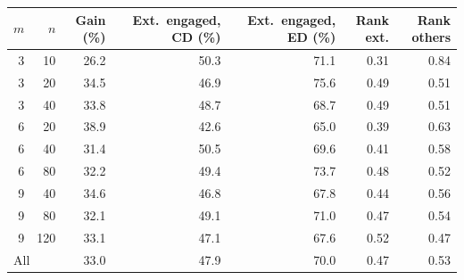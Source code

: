 \begin{tabular*}{\textwidth}{@{\extracolsep\fill}rr rrrrr@{\extracolsep\fill}}
\toprule
$m$ & $n$ & Gain (\%) & Ext.\ engaged, CD (\%) & Ext.\ engaged, ED (\%) & Rank ext. & Rank others \\
\midrule
3 & 10 & 26.2 & 50.3 & 71.1 & 0.31 & 0.84 \\
3 & 20 & 34.5 & 46.9 & 75.6 & 0.49 & 0.51 \\
3 & 40 & 33.8 & 48.7 & 68.7 & 0.49 & 0.51 \\
6 & 20 & 38.9 & 42.6 & 65.0 & 0.39 & 0.63 \\
6 & 40 & 31.4 & 50.5 & 69.6 & 0.41 & 0.58 \\
6 & 80 & 32.2 & 49.4 & 73.7 & 0.48 & 0.52 \\
9 & 40 & 34.6 & 46.8 & 67.8 & 0.44 & 0.56 \\
9 & 80 & 32.1 & 49.1 & 71.0 & 0.47 & 0.54 \\
9 & 120 & 33.1 & 47.1 & 67.6 & 0.52 & 0.47 \\
\midrule
\multicolumn{2}{l}{All} & 33.0 & 47.9 & 70.0 & 0.47 & 0.53 \\
\bottomrule
\end{tabular*}

